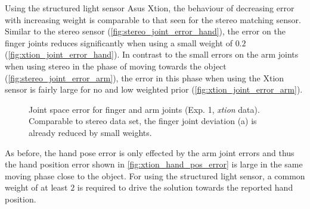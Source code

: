 Using the structured light sensor Asus Xtion, the behaviour of decreasing error with increasing weight is comparable to that seen for the stereo matching sensor. Similar to the stereo sensor (\cref{fig:stereo_joint_error_hand}), the error on the finger joints reduces significantly when using a small weight of $0.2$ (\cref{fig:xtion_joint_error_hand}).
In contrast to the small errors on the arm joints when using stereo in the phase of moving towards the object (\cref{fig:stereo_joint_error_arm}), the error in this phase when using the Xtion sensor is fairly large for no and low weighted prior (\cref{fig:xtion_joint_error_arm}).

\begin{figure}[h]
\centering
{}
%
\caption[Joint space error (Exp. 1, xtion)]{Joint space error for finger and arm joints (Exp. 1, \textit{xtion} data). Comparable to stereo data set, the finger joint deviation (a) is already reduced by small weights.}
\label{fig:xtion_joint_error}
\end{figure}

As before, the hand pose error is only effected by the arm joint errors and thus the hand position error shown in \cref{fig:xtion_hand_pos_error} is large in the same moving phase close to the object. For using the structured light sensor, a common weight of at least $2$ is required to drive the solution towards the reported hand position.

